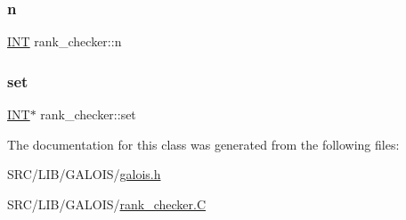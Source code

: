\subsubsection{\texorpdfstring{n}{n}}
{\footnotesize\ttfamily \mbox{\hyperlink{galois_8h_a09fddde158a3a20bd2dcadb609de11dc}{I\+NT}} rank\+\_\+checker\+::n}

\mbox{\label{classrank__checker_adb8e9d43e5242320d64755c191d7412b}} 
\subsubsection{\texorpdfstring{set}{set}}
{\footnotesize\ttfamily \mbox{\hyperlink{galois_8h_a09fddde158a3a20bd2dcadb609de11dc}{I\+NT}}$\ast$ rank\+\_\+checker\+::set}



The documentation for this class was generated from the following files\+:\begin{DoxyCompactItemize}
\item 
S\+R\+C/\+L\+I\+B/\+G\+A\+L\+O\+I\+S/\mbox{\hyperlink{galois_8h}{galois.\+h}}\item 
S\+R\+C/\+L\+I\+B/\+G\+A\+L\+O\+I\+S/\mbox{\hyperlink{rank__checker_8_c}{rank\+\_\+checker.\+C}}\end{DoxyCompactItemize}
